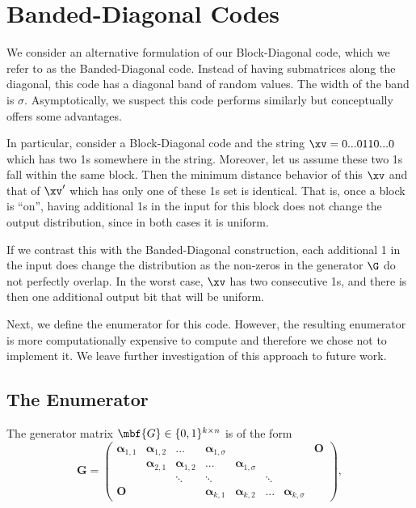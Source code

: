 \section{Banded-Diagonal Codes}\label{sec:bandedApx}

We consider an alternative formulation of our Block-Diagonal code, which we refer to as the Banded-Diagonal code. Instead of having submatrices along the diagonal, this code has a diagonal band of random values. The width of the band is $\sigma$.  Asymptotically, we suspect this code performs similarly but conceptually offers some advantages. 

In particular, consider a Block-Diagonal code and the string $\xv=0...0110...0$ which has two 1s somewhere in the string. Moreover, let us assume these two 1s fall within the same block. Then the minimum distance behavior of this $\xv$ and that of $\xv'$ which has only one of these 1s set is identical. That is, once a block is ``on'', having additional 1s in the input for this block does not change the output distribution, since in both cases it is uniform. 

If we contrast this with the Banded-Diagonal construction, each additional 1 in the input does change the distribution as the non-zeros in the generator $\G$ do not perfectly overlap. In the worst case, $\xv$ has two consecutive 1s, and there is then one additional output bit that will be uniform.

Next, we define the enumerator for this code. However, the resulting enumerator is more computationally expensive to compute and therefore we chose not to implement it. We leave further investigation of this approach to future work. 

\subsection{The Enumerator}

The generator matrix $\mbf{G} \in \{0,1\}^{k \times n}$ is of the form%
$$
    \mathbf{G} = \left(\begin{matrix}
    \mathbf{\alpha}_{1,1}&\mathbf{\alpha}_{1,2}& ...  & \mathbf{\alpha}_{1,\sigma}& & &&\mathbf{O}\\
    &\mathbf{\alpha}_{2,1}& \mathbf{\alpha}_{1,2}&...  & \mathbf{\alpha}_{1,\sigma}&  &&\\
     &  &\ddots&\ddots&&\ddots&&\\
   \mathbf{O} &  &&\mathbf{\alpha}_{k,1} &\mathbf{\alpha}_{k,2}&...  & \mathbf{\alpha}_{k,\sigma}
   \end{matrix}\right),
$$

